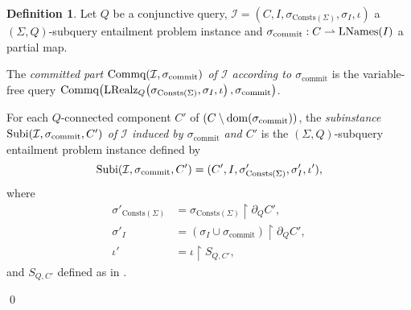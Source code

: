 \documentclass[12pt]{report}
\theoremstyle{plain}
\theoremstyle{definition}
\newtheorem{definition}[theorem]{Definition}
\def\Consts{{\mathrm{Consts}}}
\newcommand{\dom}[1]{\ensuremath{\normalfont{\operatorname{dom}}\!\left( #1 \right)}}
\newcommand{\Subi}[3]{\ensuremath{\normalfont{\textrm{Subi}}\!\left( #1, #2, #3 \right)}}
\newcommand{\Commq}[2]{\ensuremath{\normalfont{\textrm{Commq}}\!\left( #1, #2 \right)}}
\newcommand{\LNames}[1]{\ensuremath{\normalfont{\textrm{LNames}}\!\left( #1 \right)}}
\newcommand{\LRealz}[2]{\ensuremath{\normalfont{\textrm{LRealz}}_{ #1 }\!\left( #2 \right)}}
\begin{document}
\begin{definition}
\label{definition:subquery-entailment-problem-splitting}
  Let $Q$ be a conjunctive query, $\mathcal{I} = (C, I, \sigma_{\Consts(\Sigma)}, \sigma_I, \iota)$ a $(\Sigma, Q)$-subquery entailment problem instance and $\sigma_{\mathrm{commit}}: C \rightharpoonup \LNames{I}$ a partial map.

  The \emph{committed part $\Commq{\mathcal{I}}{\sigma_{\mathrm{commit}}}$ of $\mathcal{I}$ according to $\sigma_{\mathrm{commit}}$} is the variable-free query $\Commq{\LRealz{Q}{\sigma_{\Consts(\Sigma)}, \sigma_I, \iota}}{\sigma_{\mathrm{commit}}}$.

  For each $Q$-connected component $C'$ of $(C \setminus \dom{\sigma_{\mathrm{commit}}})$, the \emph{subinstance $\Subi{\mathcal{I}}{\sigma_{\mathrm{commit}}}{C'}$ of $\mathcal{I}$ induced by $\sigma_{\mathrm{commit}}$ and $C'$} is the $(\Sigma, Q)$-subquery entailment problem instance defined by
  $$\Subi{\mathcal{I}}{\sigma_{\mathrm{commit}}}{C'} = (C', I, \sigma'_{\Consts(\Sigma)}, \sigma'_I, \iota'),$$
  where \begin{align*}
    \sigma'_{\Consts(\Sigma)} &= \sigma_{\Consts(\Sigma)} \upharpoonright \partial_Q C', \\
    \sigma'_I &= (\sigma_I \cup \sigma_{\mathrm{commit}}) \upharpoonright \partial_Q C', \\
    \iota' &= \iota \upharpoonright S_{Q, C'},
  \end{align*}
  and $S_{Q, C'}$ defined as in .

  \qed
\end{definition}
\end{document}
